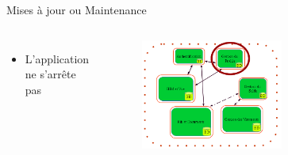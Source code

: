 \documentclass{beamer}
\begin{document}
\begin{frame}{Mises à jour ou Maintenance }
\begin{columns}
\begin{itemize}
                     \item L'application ne s'arrête pas
                \end{itemize}
        \begin{figure}
            \begin{center}
            \includegraphics[width=0.6\textwidth]{MAJMicroservices.png}
            \end{center}
        \end{figure}
        

    \end{columns}
    
\end{frame}
\end{document}
